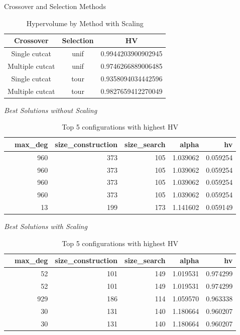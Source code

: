 \begin{frame}{Crossover and Selection Methods}
    \begin{table}[h]
        \caption{Hypervolume by Method with Scaling}
        \begin{tabular}{ccc}
            \toprule
            Crossover & Selection & HV \\
            \midrule
            Single cutcat & unif & 0.9944203900902945 \\
            Multiple cutcat & unif & 0.9746266889006485 \\
            Single cutcat & tour & 0.9358094034442596 \\
            Multiple cutcat & tour & 0.9827659412270049 \\
            \bottomrule
        \end{tabular}
    \end{table}
\end{frame}

\begin{frame}{\textit{Best Solutions without Scaling}}
    \begin{table}[h]
        \caption{Top 5 configurations with highest HV}
        \begin{tabular}{lrrrrr}
        \toprule
         & max\_deg & size\_construction & size\_search & alpha & hv \\
        \midrule
         & 960 & 373 & 105 & 1.039062 & 0.059254 \\
         & 960 & 373 & 105 & 1.039062 & 0.059254 \\
         & 960 & 373 & 105 & 1.039062 & 0.059254 \\
         & 960 & 373 & 105 & 1.039062 & 0.059254 \\
         & 13 & 199 & 173 & 1.141602 & 0.059149 \\
        \bottomrule
        \end{tabular}
    \end{table}
\end{frame}

\begin{frame}{\textit{Best Solutions with Scaling}}
    \begin{table}[h]
        \caption{Top 5 configurations with highest HV}
        \begin{tabular}{lrrrrr}
        \toprule
         & max\_deg & size\_construction & size\_search & alpha & hv \\
        \midrule
         & 52 & 101 & 149 & 1.019531 & 0.974299 \\
         & 52 & 101 & 149 & 1.019531 & 0.974299 \\
         & 929 & 186 & 114 & 1.059570 & 0.963338 \\
         & 30 & 131 & 140 & 1.180664 & 0.960207 \\
         & 30 & 131 & 140 & 1.180664 & 0.960207 \\
        \bottomrule
        \end{tabular}
    \end{table}
\end{frame}

